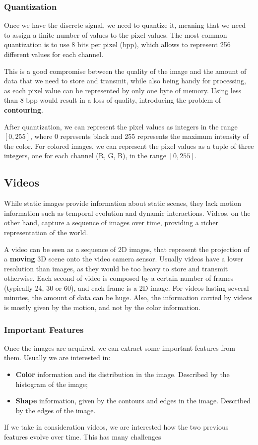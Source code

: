 \subsubsection{Quantization}
Once we have the discrete signal, we need to quantize it, meaning that we need to assign a finite number of values to the pixel values.
The most common quantization is to use 8 bits per pixel (bpp), which allows to represent 256 different values for each channel.

This is a good compromise between the quality of the image and the amount of data that we need to store and transmit, while
also being handy for processing, as each pixel value can be represented by only one byte of memory.
Using less than 8 bpp would result in a loss of quality, introducing the problem of \textbf{contouring}.

After quantization, we can represent the pixel values as integers in the range $[0,255]$, where 0 represents black and 255 represents the maximum intensity of the color.
For colored images, we can represent the pixel values as a tuple of three integers, one for each channel (R, G, B), in the range $[0,255]$.

\subsection{Videos}
While static images provide information about static scenes, they lack motion information
such as temporal evolution and dynamic interactions.
Videos, on the other hand, capture a sequence of images over time, providing a richer representation of the world.

A video can be seen as a sequence of 2D images, that represent the projection of a \textbf{moving} 3D scene onto the video camera sensor.
Usually videos have a lower resolution than images, as they would be too heavy to store and transmit otherwise. Each second of video is composed by a certain number of frames
(typically 24, 30 or 60), and each frame is a 2D image. For videos lasting several minutes, the amount of data can be huge.
Also, the information carried by videos is mostly given by the motion, and not by the color information.

\subsubsection{Important Features}
Once the images are acquired, we can extract some important features from them. Usually we are interested in:
\begin{itemize}
    \item \textbf{Color} information and its distribution in the image. Described by the histogram of the image;
    \item \textbf{Shape} information, given by the contours and edges in the image. Described by the edges of the image.
\end{itemize}
If we take in consideration videos, we are interested how the two previous features evolve over time.
This has many challenges

